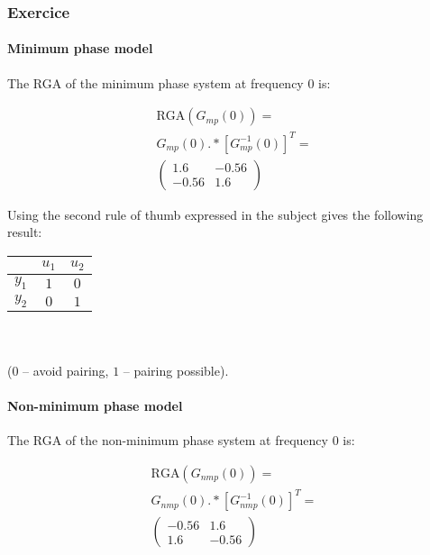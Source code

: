 \subsubsection{Exercice}
\paragraph{Minimum phase model}

The RGA of the minimum phase system at frequency $0$ is:

\begin{multline*} 
    \text{RGA}(G_{mp}(0)) = \\
    G_{mp}(0) .* [G_{mp}^{-1}(0)]^T = \\
    \left(\begin{array}{cc} 1.6 & -0.56\\ -0.56 & 1.6 \end{array}\right)
\end{multline*}

Using the second rule of thumb expressed in the subject gives the following result:

\begin{center}
\begin{tabular}{|c|cc|}
    \hline
    & $u_1$ & $u_2$ \\ 
    \hline
    $y_1$ & $1$ & $0$ \\
    $y_2$ & $0$ & $1$ \\
    \hline
\end{tabular} \ \\ \ \\
($0$ -- avoid pairing, $1$ -- pairing possible).
\end{center}

\paragraph{Non-minimum phase model}

The RGA of the non-minimum phase system at frequency $0$ is:

\begin{multline*}
    \text{RGA}(G_{nmp}(0)) = \\ 
    G_{nmp}(0) .* [G_{nmp}^{-1}(0)]^T =  \\
    \left(\begin{array}{cc} -0.56 & 1.6\\ 1.6 & -0.56 \end{array}\right)
\end{multline*}

